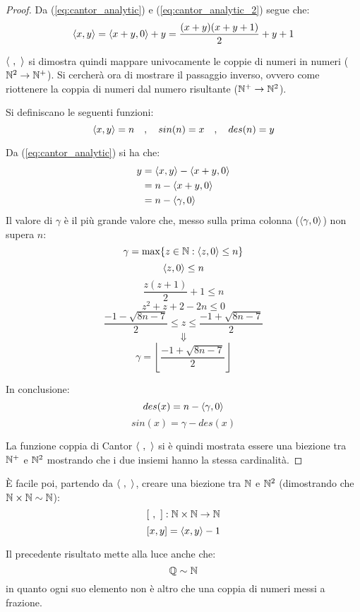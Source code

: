 \begin{proof}
    Da (\ref{eq:cantor_analytic}) e (\ref{eq:cantor_analytic_2}) segue che:
    $$ \langle x,y\rangle = \langle x+y,0\rangle+y = \frac{(x+y)(x+y+1)}{2}+y+1 $$
    
    $\cantor{\ ,\ }$ si dimostra quindi mappare univocamente le coppie di numeri
    in numeri ($\mathbb{N}^2\rightarrow\mathbb{N}^+$). Si cercherà ora di mostrare il passaggio inverso, 
    ovvero come riottenere la coppia di numeri dal numero risultante
    ($\mathbb{N}^+\rightarrow\mathbb{N}^2$).

    Si definiscano le seguenti funzioni:
    $$ \langle x,y\rangle = n \quad , \quad sin(n) = x \quad , \quad des(n) = y $$

    Da (\ref{eq:cantor_analytic}) si ha che:
    $$ \begin{aligned}
        y &= \langle x,y\rangle-\langle x+y,0\rangle \\
          &= n-\langle x+y,0\rangle \\
          &= n-\langle\gamma,0\rangle \\
    \end{aligned} $$
    Il valore di $\gamma$ è il più grande valore che, messo sulla prima colonna
    ($\langle\gamma,0\rangle$) non supera $n$:
    $$ \gamma = \max\{z\in\mathbb{N}:\langle z,0\rangle\leq n\} $$
    $$ \langle z,0\rangle\leq n $$
    $$ \frac{z(z+1)}{2}+1 \leq n $$
    $$ z^2+z+2-2n\leq 0 $$
    $$ \frac{-1-\sqrt{8n-7}}{2}\leq z \leq \frac{-1+\sqrt{8n-7}}{2} $$
    $$ \Downarrow $$
    $$ \gamma=\left\lfloor\frac{-1+\sqrt{8n-7}}{2}\right\rfloor $$
    
    In conclusione:
    $$ des(x) = n-\langle\gamma,0\rangle $$
    $$ sin(x) = \gamma-des(x) $$

    La funzione coppia di Cantor $\cantor{\ ,\ }$ si è quindi mostrata
    essere una biezione tra $\mathbb{N}^+$ e $\mathbb{N}^2$ mostrando che i due insiemi
    hanno la stessa cardinalità.
\end{proof}

È facile poi, partendo da $\cantor{\ ,\ }$, creare una biezione tra $\mathbb{N}$ e $\mathbb{N}^2$
(dimostrando che $\mathbb{N}\times\mathbb{N}\sim\mathbb{N}$):
$$ [\ ,\ ]:\mathbb{N}\times\mathbb{N}\rightarrow\mathbb{N} $$
$$ [x,y] = \langle x,y\rangle-1 $$

Il precedente risultato mette alla luce anche che:
$$ \mathbb{Q}\sim\mathbb{N} $$
in quanto ogni suo elemento non è altro che una coppia di numeri messi
a frazione.